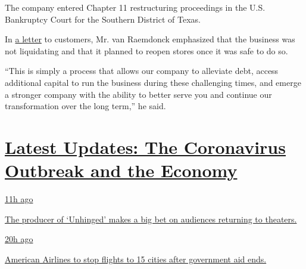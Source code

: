 The company entered Chapter 11 restructuring proceedings in the U.S.
Bankruptcy Court for the Southern District of Texas.

In
\href{https://cases.stretto.com/public/X064/10214/faqs/b25e205c-4fd0-4695-937b-c41e9aad0866.pdf}{a
letter} to customers, Mr. van Raemdonck emphasized that the business was
not liquidating and that it planned to reopen stores once it was safe to
do so.

``This is simply a process that allows our company to alleviate debt,
access additional capital to run the business during these challenging
times, and emerge a stronger company with the ability to better serve
you and continue our transformation over the long term,'' he said.

\hypertarget{latest-updates-the-coronavirus-outbreak-and-the-economy}{%
\section{\texorpdfstring{\href{https://www.nytimes3xbfgragh.onion/live/2020/08/20/business/stock-market-today-coronavirus?action=click\&pgtype=Article\&state=default\&region=MAIN_CONTENT_1\&context=storylines_live_updates}{Latest
Updates: The Coronavirus Outbreak and the
Economy}}{Latest Updates: The Coronavirus Outbreak and the Economy}}\label{latest-updates-the-coronavirus-outbreak-and-the-economy}}

\href{https://www.nytimes3xbfgragh.onion/live/2020/08/20/business/stock-market-today-coronavirus?action=click\&pgtype=Article\&state=default\&region=MAIN_CONTENT_1\&context=storylines_live_updates\#the-producer-of-unhinged-makes-a-big-bet-on-audiences-returning-to-theaters}{11h
ago}

\href{https://www.nytimes3xbfgragh.onion/live/2020/08/20/business/stock-market-today-coronavirus?action=click\&pgtype=Article\&state=default\&region=MAIN_CONTENT_1\&context=storylines_live_updates\#the-producer-of-unhinged-makes-a-big-bet-on-audiences-returning-to-theaters}{The
producer of `Unhinged' makes a big bet on audiences returning to
theaters.}

\href{https://www.nytimes3xbfgragh.onion/live/2020/08/20/business/stock-market-today-coronavirus?action=click\&pgtype=Article\&state=default\&region=MAIN_CONTENT_1\&context=storylines_live_updates\#american-airlines-to-stop-flights-to-15-cities-after-government-aid-ends}{20h
ago}

\href{https://www.nytimes3xbfgragh.onion/live/2020/08/20/business/stock-market-today-coronavirus?action=click\&pgtype=Article\&state=default\&region=MAIN_CONTENT_1\&context=storylines_live_updates\#american-airlines-to-stop-flights-to-15-cities-after-government-aid-ends}{American
Airlines to stop flights to 15 cities after government aid ends.}


